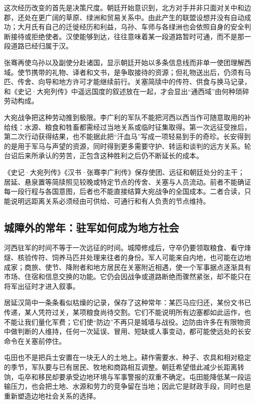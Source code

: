 这次经历改变的首先是决策尺度。朝廷开始意识到，北方对手并非只面对关中和边郡，还处在更广阔的草原、绿洲和贸易关系中。由此产生的联盟设想并没有自动成功；大月氏有自己的迁徙经历和利益，乌孙、车师与各绿洲也会依照自身的安全判断接待或拒绝使者。汉使能够到达，往往意味着某一段道路暂时可通，而不是那一段道路已经归属于汉。

张骞再使乌孙以及副使分赴诸国，显示朝廷开始以多条信息线而非单一使团理解西域。使节携带的礼物、译者和文书，是争取接待的资源；但礼物送出后，仍须有马匹、传舍、向导和地方许可才能继续前行。关塞简牍中的传符、供食与换马记录，和《史记·大宛列传》中遥远国度的叙述放在一起，才会显出“通西域”由何种琐碎劳动构成。

大宛战争把这种劳动推到极限。李广利的军队不能把河西以西当作可随意取用的补给线：水源、粮食和牲畜都需经过当地关系或临时征集取得。第一次远征受挫后，第二次行动获得结果，也不能据此把“汗血马”写成一项轻易到手的奇珍。长安得到的是用于军马与声望的资源，同时得到更多需要守护、转运和谈判的远方关系。轮台诏后来所承认的劳苦，正包含这种胜利之后仍不断延长的成本。

\begin{sourcenote}
《史记·大宛列传》《汉书·张骞李广利传》保存使团、远征和朝廷处分的主干；居延、悬泉置等简牍照见较晚或特定节点的传舍、关塞与人员流动。前者不能确证每一段行程与各国意图，后者也不能直接结算大宛战争的全国成本。二者合读，只能说明远距离关系必须经由可供给、可通行和有人负责的节点维持。
\end{sourcenote}

\subsection{城障外的常年：驻军如何成为地方社会}

河西驻军的时间不等于一次远征的时间。城障修成后，守卒仍要领取粮食、看守烽燧、核验传符、饲养马匹并处理来往者的身份。军人可能来自内地，也可能在边地成家；商旅、使节、降附者和地方居民在关塞附近相遇，使一个军事据点逐渐具有市场、住宿和信息交换的功能。它仍会因战争或道路断绝而骤然紧张，却不能只在将军出征时才进入叙事。

居延汉简中一条条看似枯燥的记录，保存了这种常年：某匹马应归还，某份文书已传递，某人凭符过关，某项粮食尚待交割。它们不能说明所有边塞都如此运作，也不能让我们量化军费；它们使“防边”不再只是城墙与战役。边防由许多在有限物资中做判断的人维持，任何一次延误、冒用、短缺或人事变动，都可能使远处的长安命令在关塞前停住。

屯田也不是把兵士安置在一块无人的土地上。耕作需要水、种子、农具和相对稳定的季节，军队要与已有居民、牧地和商路相互调整。朝廷希望借此减少长距离转饷，屯卒和移民却要承受边地环境与军事警报的双重不确定。屯田能降低某一段运输压力，也会把土地、水源和劳力的竞争留在当地；因此它是财政手段，同时也是重新塑造边地社会关系的选择。

